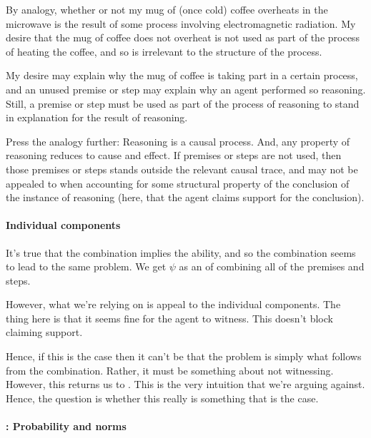 \begin{note}[Analogy]
  By analogy, whether or not my mug of (once cold) coffee overheats in the microwave is the result of some process involving electromagnetic radiation.
  My desire that the mug of coffee does not overheat is not used as part of the process of heating the coffee, and so is irrelevant to the structure of the process.

  My desire may explain why the mug of coffee is taking part in a certain process, and an unused premise or step may explain why an agent performed so reasoning.
  Still, a premise or step must be used as part of the process of reasoning to stand in explanation for the result of reasoning.

  Press the analogy further: Reasoning is a causal process.
  And, any property of reasoning reduces to cause and effect.
  If premises or steps are not used, then those premises or steps stands outside the relevant causal trace, and may not be appealed to when accounting for some structural property of the conclusion of the instance of reasoning (here, that the agent claims support for the conclusion).
\end{note}

\paragraph{Individual components}

\begin{note}
  It's true that the combination implies the ability, and so the combination seems to lead to the same problem.
  We get \(\psi\) as an \requ{} of combining all of the premises and steps.

  However, what we're relying on is appeal to the individual components.
  The thing here is that it seems fine for the agent to witness.
  This doesn't block claiming support.

  Hence, if this is the case then it can't be that the problem is simply what follows from the combination.
  Rather, it must be something about not witnessing.
  However, this returns us to \ESU{}.
  This is the very intuition that we're arguing against.
  Hence, the question is whether this really is something that is the case.
\end{note}

\paragraph{\zS{}: Probability and norms}


